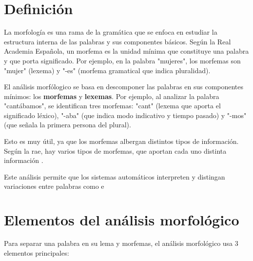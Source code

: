 \documentclass{report}
\begin{document}
\section {Definición}
La morfología es una rama de la gramática que se enfoca en estudiar la estructura interna de las palabras y sus componentes básicos. Según la Real Academia Española, un morfema es la unidad mínima que constituye una palabra y que porta significado. Por ejemplo, en la palabra "mujeres", los morfemas son "mujer" (lexema) y "-es" (morfema gramatical que indica pluralidad).

El análisis morfólogico se basa en descomponer las palabras en sus componentes mínimos: los \textbf{morfemas} y \textbf{lexemas}. Por ejemplo, al analizar la palabra "cantábamos", se identifican tres morfemas: "cant" (lexema que aporta el significado léxico), "-aba" (que indica modo indicativo y tiempo pasado) y "-mos" (que señala la primera persona del plural).

Esto es muy útil, ya que los morfemas albergan distintos tipos de información.
Según la rae, hay varios tipos de morfemas, que aportan cada uno distinta información \autocite{rae.gtg}.


Este análisis permite que los sistemas automáticos interpreten y distingan variaciones entre palabras como  e 

\section{Elementos del análisis morfológico}
Para separar una palabra en su lema y morfemas, el análisis morfológico usa 3 elementos principales:
\end{document}
